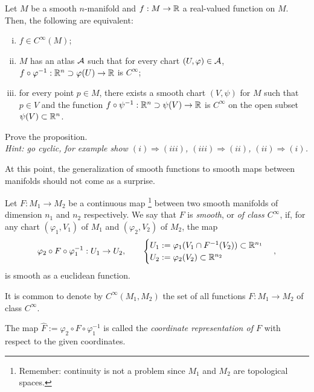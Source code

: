 \begin{proposition}
	Let $M$ be a smooth $n$-manifold and $f:M\to\mathbb{R}$ a real-valued function on $M$. Then, the following are equivalent:
	\begin{enumerate}[(i)]
		\item $f\in C^\infty(M)$;
		\item $M$ has an atlas $\mathcal{A}$ such that for every chart $(U, \varphi)\in\mathcal{A}$, $f\circ \varphi^{-1} : \mathbb{R}^n\supset\varphi(U)\to \mathbb{R}$ is $C^\infty$;
		\item for every point $p\in M$, there exists a smooth chart $(V,\psi)$ for $M$ such that $p\in V$ and the function $f\circ\psi^{-1} : \mathbb{R}^n\supset\psi(V)\to \mathbb{R}$ is $C^\infty$ on the open subset $\psi(V)\subset\mathbb{R}^n$.
	\end{enumerate}
\end{proposition}

\begin{exercise}
	Prove the proposition.\\
	\textit{\small Hint: go cyclic, for example show $(i)\Rightarrow(iii)$, $(iii)\Rightarrow(ii)$, $(ii)\Rightarrow(i)$.}
\end{exercise}

At this point, the generalization of smooth functions to smooth maps between manifolds should not come as a surprise.

\begin{definition}
	Let $F:M_1\to M_2$ be a continuous map \footnote{Remember: continuity is not a problem since $M_1$ and $M_2$ are topological spaces.} between two smooth manifolds of dimension $n_1$ and $n_2$ respectively.
	We say that $F$ is \emph{smooth}, or \emph{of class $C^\infty$}, if, for any chart $(\varphi_1, V_1)$ of $M_1$ and $(\varphi_2, V_2)$ of $M_2$, the map
	\begin{align}
		\varphi_2 \circ F \circ \varphi_1^{-1}: U_1 \to U_2,\qquad
		\begin{cases}
			U_1 := \varphi_1(V_1 \cap F^{-1}(V_2))\subset\mathbb{R}^{n_1} \\
			U_2 := \varphi_2(V_2)\subset\mathbb{R}^{n_2}
		\end{cases},
	\end{align}
	is smooth as a euclidean function.

	It is common to denote by $C^\infty(M_1, M_2)$ the set of all functions $F:M_1\to M_2$ of class $C^\infty$.

	The map $\hat F := \varphi_2 \circ F \circ \varphi_1^{-1}$ is called the \emph{coordinate representation of $F$} with respect to the given coordinates.
\end{definition}


